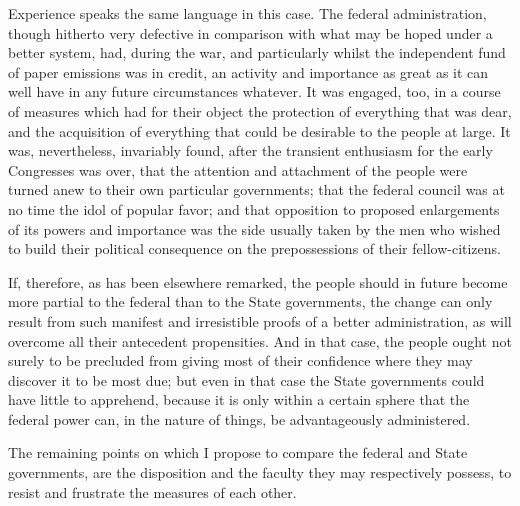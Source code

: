 Experience speaks the same language in this case. The federal administration, though hitherto very defective in comparison with what may be hoped under a better system, had, during the war, and particularly whilst the independent fund of paper emissions was in credit, an activity and importance as great as it can well have in any future circumstances whatever. It was engaged, too, in a course of measures which had for their object the protection of everything that was dear, and the acquisition of everything that could be desirable to the people at large. It was, nevertheless, invariably found, after the transient enthusiasm for the early Congresses was over, that the attention and attachment of the people were turned anew to their own particular governments; that the federal council was at no time the idol of popular favor; and that opposition to proposed enlargements of its powers and importance was the side usually taken by the men who wished to build their political consequence on the prepossessions of their fellow-citizens.

If, therefore, as has been elsewhere remarked, the people should in future become more partial to the federal than to the State governments, the change can only result from such manifest and irresistible proofs of a better administration, as will overcome all their antecedent propensities. And in that case, the people ought not surely to be precluded from giving most of their confidence where they may discover it to be most due; but even in that case the State governments could have little to apprehend, because it is only within a certain sphere that the federal power can, in the nature of things, be advantageously administered.

The remaining points on which I propose to compare the federal and State governments, are the disposition and the faculty they may respectively possess, to resist and frustrate the measures of each other.

